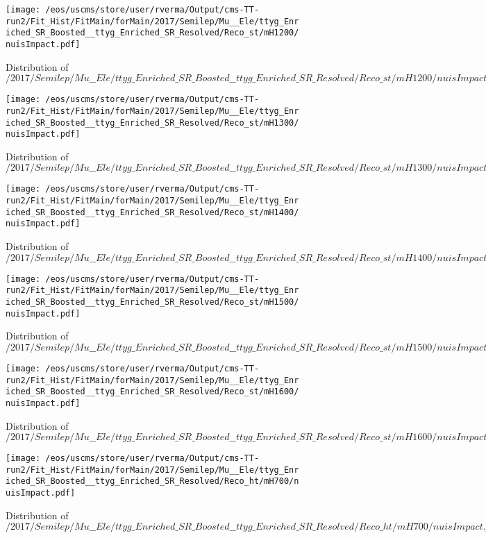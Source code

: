 \begin{figure}
\centering
\texttt{[image: /eos/uscms/store/user/rverma/Output/cms-TT-run2/Fit\_Hist/FitMain/forMain/2017/Semilep/Mu\_\_Ele/ttyg\_Enriched\_SR\_Boosted\_\_ttyg\_Enriched\_SR\_Resolved/Reco\_st/mH1200/nuisImpact.pdf]}
\caption{Distribution of $/2017/Semilep/Mu\_\_Ele/ttyg\_Enriched\_SR\_Boosted\_\_ttyg\_Enriched\_SR\_Resolved/Reco\_st/mH1200/nuisImpact.pdf$}
\end{figure}

\begin{figure}
\centering
\texttt{[image: /eos/uscms/store/user/rverma/Output/cms-TT-run2/Fit\_Hist/FitMain/forMain/2017/Semilep/Mu\_\_Ele/ttyg\_Enriched\_SR\_Boosted\_\_ttyg\_Enriched\_SR\_Resolved/Reco\_st/mH1300/nuisImpact.pdf]}
\caption{Distribution of $/2017/Semilep/Mu\_\_Ele/ttyg\_Enriched\_SR\_Boosted\_\_ttyg\_Enriched\_SR\_Resolved/Reco\_st/mH1300/nuisImpact.pdf$}
\end{figure}

\begin{figure}
\centering
\texttt{[image: /eos/uscms/store/user/rverma/Output/cms-TT-run2/Fit\_Hist/FitMain/forMain/2017/Semilep/Mu\_\_Ele/ttyg\_Enriched\_SR\_Boosted\_\_ttyg\_Enriched\_SR\_Resolved/Reco\_st/mH1400/nuisImpact.pdf]}
\caption{Distribution of $/2017/Semilep/Mu\_\_Ele/ttyg\_Enriched\_SR\_Boosted\_\_ttyg\_Enriched\_SR\_Resolved/Reco\_st/mH1400/nuisImpact.pdf$}
\end{figure}

\begin{figure}
\centering
\texttt{[image: /eos/uscms/store/user/rverma/Output/cms-TT-run2/Fit\_Hist/FitMain/forMain/2017/Semilep/Mu\_\_Ele/ttyg\_Enriched\_SR\_Boosted\_\_ttyg\_Enriched\_SR\_Resolved/Reco\_st/mH1500/nuisImpact.pdf]}
\caption{Distribution of $/2017/Semilep/Mu\_\_Ele/ttyg\_Enriched\_SR\_Boosted\_\_ttyg\_Enriched\_SR\_Resolved/Reco\_st/mH1500/nuisImpact.pdf$}
\end{figure}

\begin{figure}
\centering
\texttt{[image: /eos/uscms/store/user/rverma/Output/cms-TT-run2/Fit\_Hist/FitMain/forMain/2017/Semilep/Mu\_\_Ele/ttyg\_Enriched\_SR\_Boosted\_\_ttyg\_Enriched\_SR\_Resolved/Reco\_st/mH1600/nuisImpact.pdf]}
\caption{Distribution of $/2017/Semilep/Mu\_\_Ele/ttyg\_Enriched\_SR\_Boosted\_\_ttyg\_Enriched\_SR\_Resolved/Reco\_st/mH1600/nuisImpact.pdf$}
\end{figure}

\begin{figure}
\centering
\texttt{[image: /eos/uscms/store/user/rverma/Output/cms-TT-run2/Fit\_Hist/FitMain/forMain/2017/Semilep/Mu\_\_Ele/ttyg\_Enriched\_SR\_Boosted\_\_ttyg\_Enriched\_SR\_Resolved/Reco\_ht/mH700/nuisImpact.pdf]}
\caption{Distribution of $/2017/Semilep/Mu\_\_Ele/ttyg\_Enriched\_SR\_Boosted\_\_ttyg\_Enriched\_SR\_Resolved/Reco\_ht/mH700/nuisImpact.pdf$}
\end{figure}

